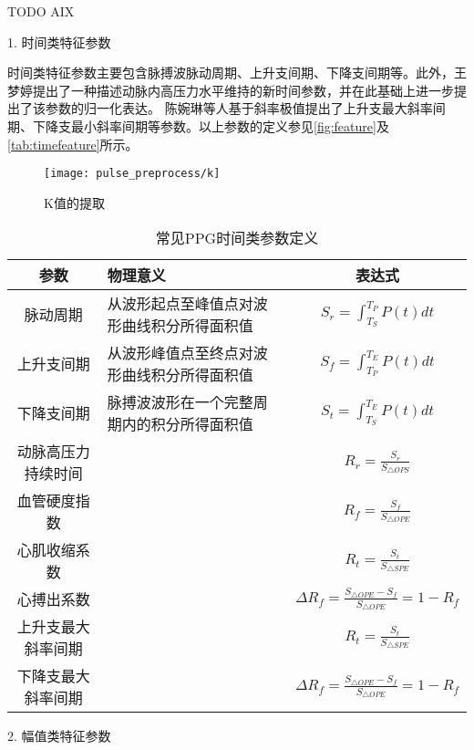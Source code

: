 TODO AIX

1. 时间类特征参数

时间类特征参数主要包含脉搏波脉动周期、上升支间期、下降支间期等。此外，王梦婷提出了一种描述动脉内高压力水平维持的新时间参数，并在此基础上进一步提出了该参数的归一化表达\cite{mmt}。
陈婉琳等人基于斜率极值提出了上升支最大斜率间期、下降支最小斜率间期等参数\cite{cwl}。以上参数的定义参见\autoref{fig:feature}及\autoref{tab:timefeature}所示。
\begin{figure}[htbp]
    \centering
    \texttt{[image: pulse\_preprocess/k]}
    \caption{\label{fig:feature}K值的提取}
\end{figure}
\begin{table}[h]
    \centering
    \caption{\label{tab:timefeature}常见PPG时间类参数定义}
    \begin{tabularx}{\linewidth}{cX<{\centering}c}
    \toprule
    \textbf{参数} & \textbf{物理意义} & \textbf{表达式} \\
    \midrule
    脉动周期      &  从波形起点至峰值点对波形曲线积分所得面积值         &  $S_r=\int_{T_S}^{T_P}P(t)dt$\\
    上升支间期      &  从波形峰值点至终点对波形曲线积分所得面积值         &  $S_f=\int_{T_P}^{T_E}P(t)dt$\\
    下降支间期      &  脉搏波波形在一个完整周期内的积分所得面积值         &  $S_t=\int_{T_S}^{T_E}P(t)dt$\\
    动脉高压力持续时间    &           &   $R_r=\frac{S_r}{S_{\triangle OPS}}$    \\
    血管硬度指数    &           &   $R_f=\frac{S_f}{S_{\triangle OPE}}$    \\
    心肌收缩系数    &           &   $R_t=\frac{S_t}{S_{\triangle SPE}}$    \\
    心搏出系数&           &    $\Delta R_f=\frac{S_{\triangle OPE}-S_f}{S_{\triangle OPE}}=1-R_f$\\
    上升支最大斜率间期    &           &   $R_t=\frac{S_t}{S_{\triangle SPE}}$    \\
    下降支最大斜率间期&           &    $\Delta R_f=\frac{S_{\triangle OPE}-S_f}{S_{\triangle OPE}}=1-R_f$\\
    \bottomrule
    \end{tabularx}
\end{table}

2. 幅值类特征参数

